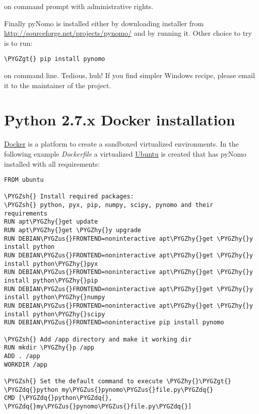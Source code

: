 \documentclass[a4paper,11pt,english]{sphinxmanual}
\def\PYGZus{\char`\_}
\def\PYGZgt{\char`\>}
\def\PYGZsh{\char`\#}
\def\PYGZhy{\char`\-}
\def\PYGZdq{\char`\"}
\begin{document}
on command prompt with administrative rights.

Finally pyNomo is installed either by downloading installer from  \href{http://sourceforge.net/projects/pynomo/files/pynomo/}{http://sourceforge.net/projects/pynomo/} and by running it. Other choice to try is to run:

\begin{Verbatim}[commandchars=\\\{\},formatcom=\scriptsize]
\PYGZgt{} pip install pynomo
\end{Verbatim}

on command line. Tedious, huh! If you find simpler Windows recipe, please email it to the maintainer of the project.


\section{Python 2.7.x Docker installation}
\label{installation/installation:python-2-7-x-docker-installation}
\href{https://www.docker.com/}{Docker} is a platform to create a sandboxed virtualized environments. In the following example \emph{Dockerfile} a virtualized
\href{http://ubuntu.com/}{Ubuntu} is created that has pyNomo installed with all requirements:

\begin{Verbatim}[commandchars=\\\{\},formatcom=\scriptsize]
FROM ubuntu

\PYGZsh{} Install required packages:
\PYGZsh{} python, pyx, pip, numpy, scipy, pynomo and their requirements
RUN apt\PYGZhy{}get update
RUN apt\PYGZhy{}get \PYGZhy{}y upgrade
RUN DEBIAN\PYGZus{}FRONTEND=noninteractive apt\PYGZhy{}get \PYGZhy{}y install python
RUN DEBIAN\PYGZus{}FRONTEND=noninteractive apt\PYGZhy{}get \PYGZhy{}y install python\PYGZhy{}pyx
RUN DEBIAN\PYGZus{}FRONTEND=noninteractive apt\PYGZhy{}get \PYGZhy{}y install python\PYGZhy{}pip
RUN DEBIAN\PYGZus{}FRONTEND=noninteractive apt\PYGZhy{}get \PYGZhy{}y install python\PYGZhy{}numpy
RUN DEBIAN\PYGZus{}FRONTEND=noninteractive apt\PYGZhy{}get \PYGZhy{}y install python\PYGZhy{}scipy
RUN DEBIAN\PYGZus{}FRONTEND=noninteractive pip install pynomo

\PYGZsh{} Add /app directory and make it working dir
RUN mkdir \PYGZhy{}p /app
ADD . /app
WORKDIR /app

\PYGZsh{} Set the default command to execute \PYGZhy{}\PYGZgt{} \PYGZdq{}python my\PYGZus{}pynomo\PYGZus{}file.py\PYGZdq{}
CMD [\PYGZdq{}python\PYGZdq{}, \PYGZdq{}my\PYGZus{}pynomo\PYGZus{}file.py\PYGZdq{}]
\end{Verbatim}
\end{document}
